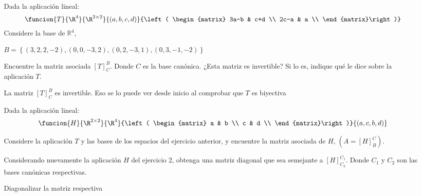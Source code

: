 \documentclass[10pt,a4]{examenEPN}
\begin{document}
\encabezado
\begin{preguntas}
\item Dada la aplicación lineal:
\[
    \funcion{T}{\R^4}{\R^{2\times 2}}{(a,b,c,d)}{\left( \begin{matrix}
        3a-b & c+d \\
        2c-a & a \\
     \end{matrix}\right)}
\]
Considere la base de $\mathbb{R}^4$,

$ B=\left\{(3,2,2,-2), (0,0,-3,2),(0,2,-3,1),(0,3,-1,-2)   \right\}$


Encuentre la matriz asociada $[T]_C^B$. Donde $C$ es la base can\'onica. ¿Esta matriz es invertible? Si lo es, indique qu\'e le dice sobre la aplicación $T$.
\begin{respuesta}
La matriz $[T]_C^B$ es invertible. Eso se lo puede ver desde inicio al comprobar que $T$ es biyectiva
\end{respuesta}

\item Dada la aplicación lineal:
\[
    \funcion{H}{\R^{2\times 2}}{\R^4}{\left( \begin{matrix}
        a & b \\
        c & d \\
     \end{matrix}\right)}{(a,c,b,d)}
\]

Considere la aplicaci\'on $T$ y las bases de los espacios del ejercicio anterior, y encuentre la matriz asociada de $H$, $(A=[H]_B^C)$.


\item Considerando nuevamente la aplicaci\'on $H$ del ejercicio 2, obtenga una matriz diagonal que sea semejante a $[H]_{C_2}^{C_1}$. Donde $C_1$ y $C_2$ son las bases can\'onicas respectivas.
\begin{respuesta}
Diagonalizar la matriz respectiva
\end{respuesta}


\end{preguntas}
\end{document}
